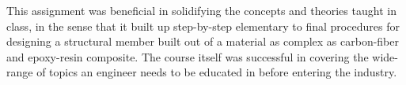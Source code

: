 \documentclass[a4paper,twosided,11pt,DIV14]{scrartcl}
\begin{document}
This assignment was beneficial in solidifying the concepts and theories
taught in class, in the sense that it built up step-by-step
elementary to final procedures for designing a structural member built out of a
material as complex as carbon-fiber and epoxy-resin composite.
The course itself was successful in covering the wide-range of topics an
engineer needs to be educated in before entering the industry.
\end{document}
